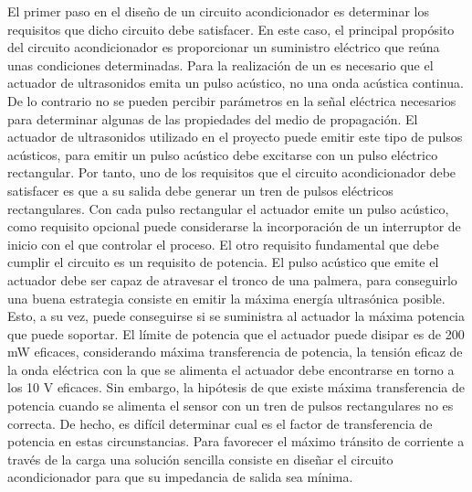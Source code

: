 El primer paso en el diseño de un circuito acondicionador es determinar los
requisitos que dicho circuito debe satisfacer. En este caso, el principal
propósito del circuito acondicionador es proporcionar un suministro
eléctrico que reúna unas condiciones determinadas. Para la realización de
un  es necesario que el actuador de ultrasonidos emita un pulso
acústico, no una onda acústica continua. De lo contrario no se pueden
percibir parámetros en la señal eléctrica necesarios para determinar
algunas de las propiedades del medio de propagación. El actuador de
ultrasonidos utilizado en el proyecto puede emitir este tipo de pulsos
acústicos, para emitir un pulso acústico debe excitarse con un pulso
eléctrico rectangular. Por tanto, uno de los requisitos que el circuito
acondicionador debe satisfacer es que a su salida debe generar un tren de
pulsos eléctricos rectangulares. Con cada pulso rectangular el actuador
emite un pulso acústico, como requisito opcional puede considerarse la
incorporación de un interruptor de inicio con el que controlar el proceso.
El otro requisito fundamental que debe cumplir el circuito es un requisito
de potencia. El pulso acústico que emite el actuador debe ser capaz de
atravesar el tronco de una palmera, para conseguirlo una buena estrategia
consiste en emitir la máxima energía ultrasónica posible. Esto, a su vez,
puede conseguirse si se suministra al actuador la máxima potencia que puede
soportar. El límite de potencia que el actuador puede disipar es de 200 mW
eficaces, considerando máxima transferencia de potencia, la tensión eficaz
de la onda eléctrica con la que se alimenta el actuador debe encontrarse en
torno a los 10 V eficaces. Sin embargo, la hipótesis de que existe máxima
transferencia de potencia cuando se alimenta el sensor con un tren de
pulsos rectangulares no es correcta. De hecho, es difícil determinar cual
es el factor de transferencia de potencia en estas circunstancias. Para
favorecer el máximo tránsito de corriente a través de la carga una solución
sencilla consiste en diseñar el circuito acondicionador para que su
impedancia de salida sea mínima.

